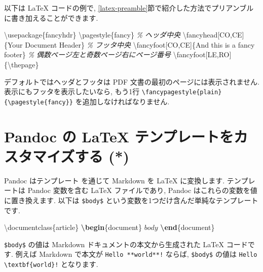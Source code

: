 \documentclass[
  11pt,
]{bxjsreport}
\newenvironment{Shaded}{\begin{snugshade}}{\end{snugshade}}
\newcommand{\BuiltInTok}[1]{#1}
\newcommand{\CommentTok}[1]{\textcolor[rgb]{0.56,0.35,0.01}{\textit{#1}}}
\newcommand{\ExtensionTok}[1]{#1}
\newcommand{\FunctionTok}[1]{\textcolor[rgb]{0.00,0.00,0.00}{#1}}
\newcommand{\KeywordTok}[1]{\textcolor[rgb]{0.13,0.29,0.53}{\textbf{#1}}}
\newcommand{\NormalTok}[1]{#1}
\newcommand{\SpecialStringTok}[1]{\textcolor[rgb]{0.31,0.60,0.02}{#1}}
\begin{document}
以下は LaTeX コードの例で, \ref{latex-preamble}節で紹介した方法でプリアンブルに書き加えることができます.

\begin{Shaded}
\begin{Highlighting}[]
\BuiltInTok{\textbackslash{}usepackage}\NormalTok{\{}\ExtensionTok{fancyhdr}\NormalTok{\}}
\FunctionTok{\textbackslash{}pagestyle}\NormalTok{\{fancy\}}
\CommentTok{\% ヘッダ中央}
\FunctionTok{\textbackslash{}fancyhead}\NormalTok{[CO,CE]\{Your Document Header\}}
\CommentTok{\% フッタ中央}
\FunctionTok{\textbackslash{}fancyfoot}\NormalTok{[CO,CE]\{And this is a fancy footer\}}
\CommentTok{\% 偶数ページ左と奇数ページ右にページ番号}
\FunctionTok{\textbackslash{}fancyfoot}\NormalTok{[LE,RO]\{}\FunctionTok{\textbackslash{}thepage}\NormalTok{\}}
\end{Highlighting}
\end{Shaded}

デフォルトではヘッダとフッタは PDF 文書の最初のページには表示されません. 表示にもフッタを表示したいなら, もう1行 \texttt{\textbackslash{}fancypagestyle\{plain\}\{\textbackslash{}pagestyle\{fancy\}\}} を追加しなければなりません.

\hypertarget{latex-template}{%
\section{Pandoc の LaTeX テンプレートをカスタマイズする (*)}\label{latex-template}}

Pandoc はテンプレート を通じて Markdown を LaTeX に変換します. テンプレートは Pandoc 変数を含む LaTeX ファイルであり, Pandoc はこれらの変数を値に置き換えます. 以下は \texttt{\$body\$} という変数を1つだけ含んだ単純なテンプレートです.

\begin{Shaded}
\begin{Highlighting}[]
\BuiltInTok{\textbackslash{}documentclass}\NormalTok{\{}\ExtensionTok{article}\NormalTok{\}}
\KeywordTok{\textbackslash{}begin}\NormalTok{\{}\ExtensionTok{document}\NormalTok{\}}
\SpecialStringTok{$body$}
\KeywordTok{\textbackslash{}end}\NormalTok{\{}\ExtensionTok{document}\NormalTok{\}}
\end{Highlighting}
\end{Shaded}

\texttt{\$body\$} の値は Markdown ドキュメントの本文から生成された LaTeX コードです. 例えば Markdown で本文が \texttt{Hello **world**!} ならば, \texttt{\$body\$} の値は \texttt{Hello \textbackslash{}textbf\{world\}!} となります.
\end{document}
